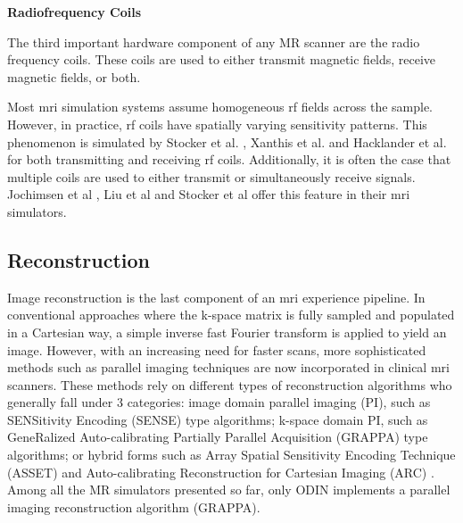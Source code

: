 \hfill

\large \textbf{Radiofrequency Coils} \normalsize

The third important hardware component of any MR scanner are the radio frequency coils.
These coils are used to either transmit magnetic fields, receive magnetic fields, or both.

\hfill

Most \ac{mri} simulation systems assume homogeneous \ac{rf} fields across the sample.
However, in practice, \ac{rf} coils have spatially varying sensitivity patterns.
This phenomenon is simulated by Stocker et al. \cite{Stocker2010}, Xanthis et al. \cite{Xanthis2014} and Hacklander et al. \cite{Hacklander2005} for both transmitting and receiving \ac{rf} coils.
Additionally, it is often the case that multiple coils are used to either transmit or simultaneously receive signals.
Jochimsen et al \cite{Jochimsen2004}, Liu et al \cite{Liu2014} and Stocker et al \cite{Stocker2010} offer this feature in their \ac{mri} simulators.

\hfill

\subsection{Reconstruction}

Image reconstruction is the last component of an \ac{mri} experience pipeline.
In conventional approaches where the k-space matrix is fully sampled and populated in a Cartesian way, a simple inverse fast Fourier transform is applied to yield an image.
However, with an increasing need for faster scans, more sophisticated methods such as parallel imaging techniques are now incorporated in clinical \ac{mri} scanners.
These methods rely on different types of reconstruction algorithms who generally fall under 3 categories: image domain parallel imaging (PI), such as SENSitivity Encoding (SENSE) type algorithms; k-space domain PI, such as GeneRalized Auto-calibrating Partially Parallel Acquisition (GRAPPA) type algorithms; or hybrid forms such as Array Spatial Sensitivity Encoding Technique (ASSET) and Auto-calibrating Reconstruction for Cartesian Imaging (ARC) \cite{Deshmane2012}.
Among all the MR simulators presented so far, only ODIN \cite{Jochimsen2004} implements a parallel imaging reconstruction algorithm (GRAPPA).

